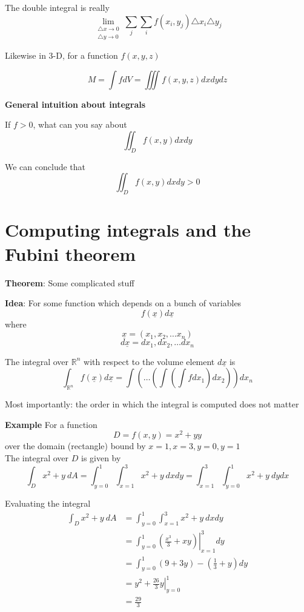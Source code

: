 The double integral is really
\[
   \lim_{\substack{\triangle x \to 0 \\ \triangle y \to 0}} \sum_{j} \sum_{i} f(x_i, y_j) \triangle x_i \triangle y_j
\] 

Likewise in 3-D, for a function $f(x, y, z)$

\[
  M = \int f dV = \iiint f(x, y, z) dx dy dz
\] 

\textbf{General intuition about integrals}

If $f > 0$, what can you say about \[
   \iint_{D} f(x,y) dx dy
\] 

We can conclude that \[
   \iint_{D} f(x,y) dx dy > 0
\] 

\section{Computing integrals and the Fubini theorem}

\begin{framed}
   \textbf{Theorem}: Some complicated stuff

   \textbf{Idea}: For some function which depends on a bunch of variables
   \[
     f( \underline{x}) d \underline{x} 
   \]  
   where 
   \[
   \underline{x} = (x_1, x_2,  \hdots x_n)
   \] 
   \[
   d\underline{x} = dx_1, dx_2,  \hdots dx_n
   \] 

   The integral over $ \mathbb{R}^n$ with respect to the volume element $d \underline{x}$ is
   \[
      \int_{ \mathbb{R}^n} f ( \underline{x}) d \underline{x} =
        \int \left( 
           \hdots \left( 
              \int \left( 
                 \int f dx_1
              \right) dx_2
           \right) 
        \right)  dx_n
   \]  

   Most importantly: the order in which the integral is computed does not matter
  
\end{framed}

\textbf{Example}
For a function 
\[
  D = f(x, y) = x^2 + yy
\] over the domain (rectangle) bound by $x = 1, x = 3, y = 0, y = 1$ \\

The integral over $D $ is given by
\[
   \int_{D} x^2 + y\ dA = 
   \int_{y=0}^{1}\int_{x=1}^{3} x^2 + y\ dx dy = 
   \int_{x=1}^{3}\int_{y=0}^{1} x^2 + y\ dy dx
\]

Evaluating the integral
\[
\begin{align*}
   \int_{D} x^2 + y\ dA &= \int_{y=0}^{1}\int_{x=1}^{3} x^2 + y\ dx dy \\
                        &= \int_{y = 0}^{1} \left. \left(  
                           \frac{x^3}{3} + xy
                        \right) \right|_{x=1}^{3} dy \\
                        &= \int_{y=0}^{1} (9+3y) - ( \frac{1}{3} + y) dy \\
                        &=  \left. y^2 + \frac{26}{3}y \right|_{y=0}^{1} \\
                        &= \frac{29}{3}
\end{align*}
\] 

